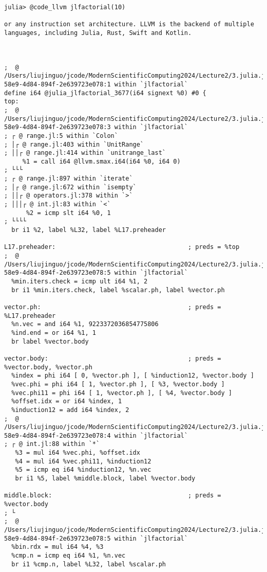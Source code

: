 \documentclass[
  notoc %
]{tufte-book}
\begin{document}
\begin{lstlisting}
julia> @code_llvm jlfactorial(10)

or any instruction set architecture. LLVM is the backend of multiple languages, including Julia, Rust, Swift and Kotlin.



;  @ /Users/liujinguo/jcode/ModernScientificComputing2024/Lecture2/3.julia.jl#==#d2429055-58e9-4d84-894f-2e639723e078:1 within `jlfactorial`
define i64 @julia_jlfactorial_3677(i64 signext %0) #0 {
top:
;  @ /Users/liujinguo/jcode/ModernScientificComputing2024/Lecture2/3.julia.jl#==#d2429055-58e9-4d84-894f-2e639723e078:3 within `jlfactorial`
; ┌ @ range.jl:5 within `Colon`
; │┌ @ range.jl:403 within `UnitRange`
; ││┌ @ range.jl:414 within `unitrange_last`
     %1 = call i64 @llvm.smax.i64(i64 %0, i64 0)
; └└└
; ┌ @ range.jl:897 within `iterate`
; │┌ @ range.jl:672 within `isempty`
; ││┌ @ operators.jl:378 within `>`
; │││┌ @ int.jl:83 within `<`
      %2 = icmp slt i64 %0, 1
; └└└└
  br i1 %2, label %L32, label %L17.preheader

L17.preheader:                                    ; preds = %top
;  @ /Users/liujinguo/jcode/ModernScientificComputing2024/Lecture2/3.julia.jl#==#d2429055-58e9-4d84-894f-2e639723e078:5 within `jlfactorial`
  %min.iters.check = icmp ult i64 %1, 2
  br i1 %min.iters.check, label %scalar.ph, label %vector.ph

vector.ph:                                        ; preds = %L17.preheader
  %n.vec = and i64 %1, 9223372036854775806
  %ind.end = or i64 %1, 1
  br label %vector.body

vector.body:                                      ; preds = %vector.body, %vector.ph
  %index = phi i64 [ 0, %vector.ph ], [ %induction12, %vector.body ]
  %vec.phi = phi i64 [ 1, %vector.ph ], [ %3, %vector.body ]
  %vec.phi11 = phi i64 [ 1, %vector.ph ], [ %4, %vector.body ]
  %offset.idx = or i64 %index, 1
  %induction12 = add i64 %index, 2
;  @ /Users/liujinguo/jcode/ModernScientificComputing2024/Lecture2/3.julia.jl#==#d2429055-58e9-4d84-894f-2e639723e078:4 within `jlfactorial`
; ┌ @ int.jl:88 within `*`
   %3 = mul i64 %vec.phi, %offset.idx
   %4 = mul i64 %vec.phi11, %induction12
   %5 = icmp eq i64 %induction12, %n.vec
   br i1 %5, label %middle.block, label %vector.body

middle.block:                                     ; preds = %vector.body
; └
;  @ /Users/liujinguo/jcode/ModernScientificComputing2024/Lecture2/3.julia.jl#==#d2429055-58e9-4d84-894f-2e639723e078:5 within `jlfactorial`
  %bin.rdx = mul i64 %4, %3
  %cmp.n = icmp eq i64 %1, %n.vec
  br i1 %cmp.n, label %L32, label %scalar.ph


\end{lstlisting}
\end{document}
